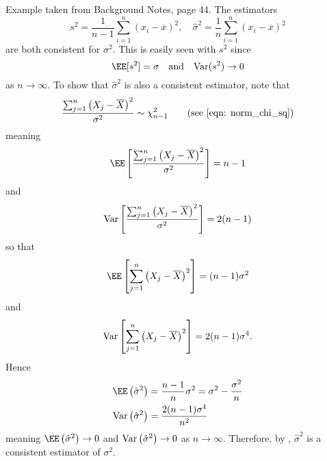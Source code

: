 \begin{exam} \label{exam: exam: norm_consistent_var}
    Example taken from Background Notes, page 44. The estimators
    \begin{equation*}
        s^2 = \frac{1}{n-1} \sum_{i=1}^{n} (x_i - \overline{x})^2 , \quad \hat{\sigma}^2 = \frac{1}{n} \sum_{i=1}^{n} (x_i - \overline{x})^2
    \end{equation*}
    are both consistent for $\sigma^2$. This is easily seen with $s^2$ since
    \begin{equation*}
        \EE [s^2] = \sigma \quad \text{and} \quad \Var (s^2) \to 0
    \end{equation*}
    as $n \to \infty$. To show that $\hat{\sigma}^2$ is also a consistent estimator, note that
    \begin{equation*}
        \frac{\sum_{j=1}^{n} \left(X_j - \overline{X} \right)^2}{\sigma^2} \sim \chi_{n-1}^{2} \tag{see \ref{eqn: norm_chi_sq}}
    \end{equation*}
    meaning
    \begin{equation*}
        \EE \left[ \frac{\sum_{j=1}^{n} \left(X_j - \overline{X} \right)^2}{\sigma^2} \right] =  n-1
    \end{equation*}
    and
    \begin{equation*}
        {\operatorname{Var}} \left[ \frac{\sum_{j=1}^{n} \left(X_j - \overline{X} \right)^2}{\sigma^2} \right] =  2(n-1)
    \end{equation*}
    so that
    \begin{equation*}
        \EE \left[ \sum_{j=1}^{n} \left(X_j - \overline{X} \right)^2 \right] =  (n-1) \sigma^2
    \end{equation*}
    and
    \begin{equation*}
        {\operatorname{Var}} \left[ \sum_{j=1}^{n} \left(X_j - \overline{X} \right)^2 \right] =  2(n-1) \sigma^4 .
    \end{equation*}
    Hence
    \begin{align*}
        \EE \left( \hat{\sigma}^2 \right)  & = \frac{n-1}{n} \sigma^2 = \sigma^2 - \frac{\sigma^2}{n} \\
        \Var \left( \hat{\sigma}^2 \right) & = \frac{2 (n-1) \sigma^4}{n^2}
    \end{align*}
    meaning $\EE \left( \hat{\sigma}^2 \right) \to 0$ and ${\operatorname{Var}} \left( \hat{\sigma}^2 \right) \to 0$ as $n \to \infty$. Therefore, by , $\hat{\sigma}^2$ is a consistent estimator of $\sigma^2$.
\end{exam}

